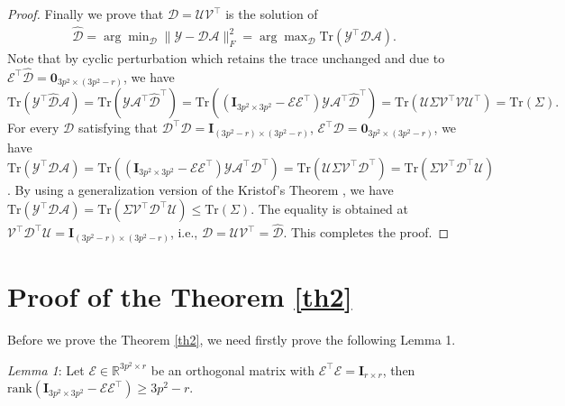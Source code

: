\begin{proof}
Finally we prove that $\hat{\mathcal{D}}=\mathcal{U}\mathcal{V}^{\top}$ is the solution of
\begin{equation}\label{equ26}
\begin{split}
\hat{\mathcal{D}}
=
\arg\min\nolimits_{\mathcal{D}}
\|\mathcal{Y}-\mathcal{D}\mathcal{A}\|_{F}^{2}
=
\arg\max\nolimits_{\mathcal{D}}
\text{Tr}(\mathcal{Y}^{\top}\mathcal{D}\mathcal{A}).
\end{split}
\end{equation}
Note that by cyclic perturbation which retains the trace unchanged and due to $\mathcal{E}^{\top}\hat{\mathcal{D}}=\bm{0}_{3p^2\times (3p^2-r)}$, we have 
$
\text{Tr}(\mathcal{Y}^{\top}\hat{\mathcal{D}}\mathcal{A})
=
\text{Tr}(\mathcal{Y}\mathcal{A}^{\top}\hat{\mathcal{D}}^{\top})
=
\text{Tr}((\bm{I}_{3p^2\times 3p^2}-\mathcal{E}\mathcal{E}^{\top})\mathcal{Y}\mathcal{A}^{\top}\hat{\mathcal{D}}^{\top})
=
\text{Tr}(\mathcal{U}\Sigma\mathcal{V}^{\top}\mathcal{V}\mathcal{U}^{\top})
=
\text{Tr}(\Sigma).
$
For every $\mathcal{D}$ satisfying that $\mathcal{D}^{\top}\mathcal{D} = \bm{I}_{(3p^2-r)\times (3p^2-r)}$, $\mathcal{E}^{\top}\mathcal{D} = \bm{0}_{3p^2\times (3p^2-r)}$, we have 
$
\text{Tr}(\mathcal{Y}^{\top}\mathcal{D}\mathcal{A})
=
\text{Tr}((\bm{I}_{3p^2\times 3p^2}-\mathcal{E}\mathcal{E}^{\top})\mathcal{Y}\mathcal{A}^{\top}\mathcal{D}^{\top})
=
\text{Tr}(\mathcal{U}\Sigma\mathcal{V}^{\top}\mathcal{D}^{\top})
=
\text{Tr}(\Sigma\mathcal{V}^{\top}\mathcal{D}^{\top}\mathcal{U})
$.
By using a generalization version \cite{TenBerge1983} of the Kristof's Theorem \cite{Kristof1970515}, we have $\text{Tr}(\mathcal{Y}^{\top}\mathcal{D}\mathcal{A})
=
\text{Tr}(\Sigma\mathcal{V}^{\top}\mathcal{D}^{\top}\mathcal{U})
\le
\text{Tr}(\Sigma)
.
$
The equality is obtained at 
$\mathcal{V}^{\top}\mathcal{D}^{\top}\mathcal{U}=\bm{I}_{(3p^2-r)\times (3p^2-r)}$, i.e., $\mathcal{D}=\mathcal{U}\mathcal{V}^{\top}=\hat{\mathcal{D}}$. This completes the proof.
\end{proof}

\section{Proof of the Theorem \ref{th2}}

Before we prove the Theorem \ref{th2}, we need firstly prove the following Lemma 1.

\emph{Lemma 1}: Let $\mathcal{E}\in\mathbb{R}^{3p^2\times r}$ be an orthogonal matrix with $\mathcal{E}^{\top}\mathcal{E}=\bm{I}_{r\times r}$, then $\text{rank}(\bm{I}_{3p^2\times 3p^2}-\mathcal{E}\mathcal{E}^{\top})\ge 3p^2-r$.


